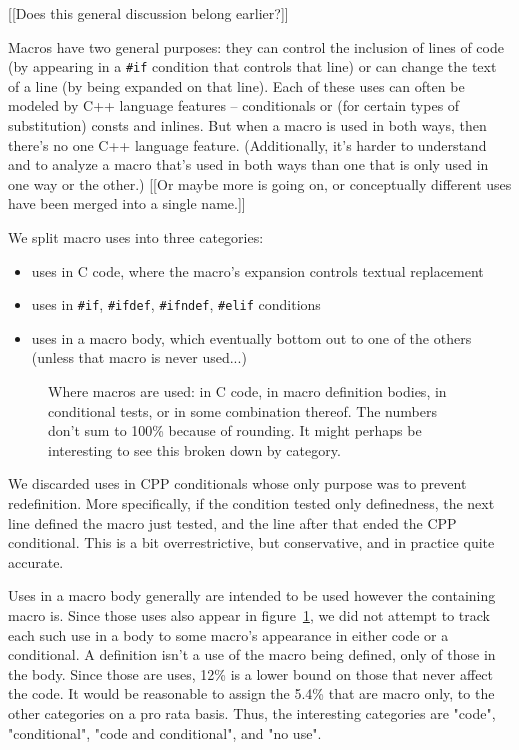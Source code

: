 \documentclass[10pt]{article}
\begin{document}
[[Does this general discussion belong earlier?]]

Macros have two general purposes: they can control the inclusion of lines
of code (by appearing in a {\tt \#if} condition that controls that line) or
can change the text of a line (by being expanded on that line).  Each of
these uses can often be modeled by C++ language features -- conditionals or
(for certain types of substitution) consts and inlines.  But when a macro
is used in both ways, then there's no one C++ language feature.
(Additionally, it's harder to understand and to analyze a macro that's used
in both ways than one that is only used in one way or the other.)
[[Or maybe more is going on, or conceptually different uses have been
merged into a single name.]]

    We split macro uses into three categories:  
\begin{itemize}
\item
  uses in C code, where the macro's expansion controls textual
            replacement
\item
  uses in {\tt \#if}, {\tt \#ifdef}, {\tt \#ifndef}, {\tt \#elif} conditions
\item
  uses in a macro body, which eventually bottom out to one of the
            others (unless that macro is never used...)
\end{itemize}

\begin{figure}
{\small
  \setlength{\tabcolsep}{.25em}
}
\caption{Where macros are used: in C code, in macro definition bodies, in
  conditional tests, or in some combination thereof.  The numbers don't sum to
  100\% because of rounding.  It might perhaps be interesting to see this
  broken down by category.}
\label{fig:where-used}
\end{figure}

      We discarded uses in CPP conditionals whose only purpose was to
        prevent redefinition.  More specifically, if the condition tested
        only definedness, the next line defined the macro just tested, and
        the line after that ended the CPP conditional.  This is a bit
        overrestrictive, but conservative, and in practice quite accurate.
        
        Uses in a macro body generally are intended to be used however the
        containing macro is.  Since those uses also appear in
        figure~\ref{fig:where-used}, we did not attempt to track each such
        use in a body to some macro's appearance in either code or a
        conditional.  
        A definition isn't a use of the macro being defined, only of those
        in the body.  Since those are uses, 12\% is a lower bound on those
        that never affect the code.
        It would be reasonable to assign the 5.4\% that are macro only, to
        the other categories on a pro rata basis.
        Thus, the interesting categories are "code",
        "conditional", "code and conditional", and "no use".
\end{document}

